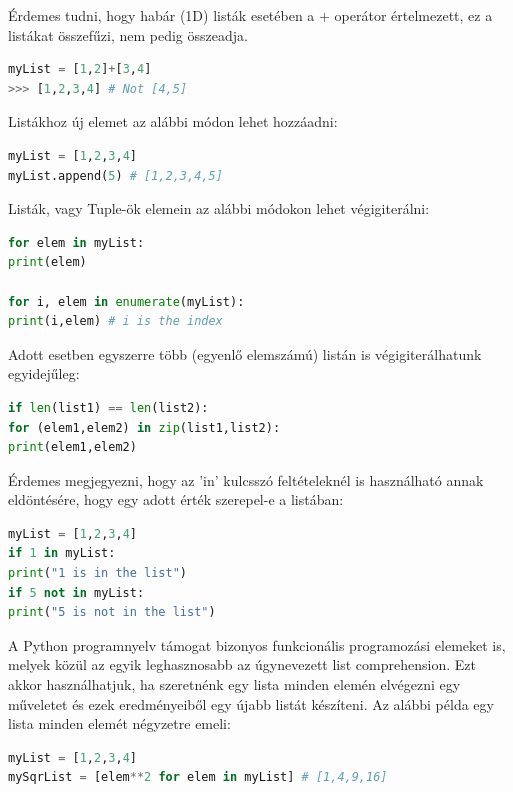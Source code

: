 \documentclass[12pt,a4paper,oneside]{report}             %
\begin{document}
Érdemes tudni, hogy habár (1D) listák esetében a $+$ operátor értelmezett, ez a listákat összefűzi, nem pedig összeadja.

\begin{lstlisting}[language=Python]
myList = [1,2]+[3,4]
>>> [1,2,3,4] # Not [4,5]
\end{lstlisting}

Listákhoz új elemet az alábbi módon lehet hozzáadni:

\begin{lstlisting}[language=Python]
myList = [1,2,3,4]
myList.append(5) # [1,2,3,4,5]
\end{lstlisting}

Listák, vagy Tuple-ök elemein az alábbi módokon lehet végigiterálni:

\begin{lstlisting}[language=Python]
for elem in myList:
print(elem)

for i, elem in enumerate(myList):
print(i,elem) # i is the index
\end{lstlisting}

Adott esetben egyszerre több (egyenlő elemszámú) listán is végigiterálhatunk egyidejűleg:

\begin{lstlisting}[language=Python]
if len(list1) == len(list2):
for (elem1,elem2) in zip(list1,list2):
print(elem1,elem2)
\end{lstlisting}

Érdemes megjegyezni, hogy az 'in' kulcsszó feltételeknél is használható annak eldöntésére, hogy egy adott érték szerepel-e a listában:

\begin{lstlisting}[language=Python]
myList = [1,2,3,4]
if 1 in myList:
print("1 is in the list")
if 5 not in myList:
print("5 is not in the list")
\end{lstlisting}

A Python programnyelv támogat bizonyos funkcionális programozási elemeket is, melyek közül az egyik leghasznosabb az úgynevezett list comprehension. Ezt akkor használhatjuk, ha szeretnénk egy lista minden elemén elvégezni egy műveletet és ezek eredményeiből egy újabb listát készíteni. Az alábbi példa egy lista minden elemét négyzetre emeli:

\begin{lstlisting}[language=Python]
myList = [1,2,3,4]
mySqrList = [elem**2 for elem in myList] # [1,4,9,16]
\end{lstlisting}
\end{document}
